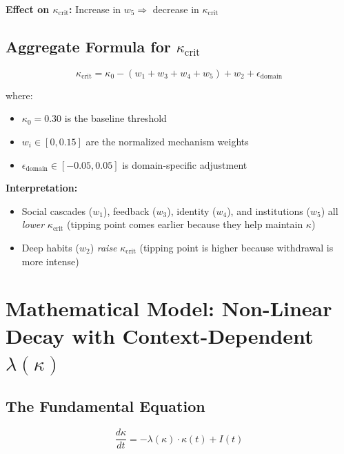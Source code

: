 \documentclass[11pt, a4paper]{article}
\begin{document}
\textbf{Effect on $\kappa_{\text{crit}}$:} Increase in $w_5 \Rightarrow$ decrease in $\kappa_{\text{crit}}$

\subsection{Aggregate Formula for $\kappa_{\text{crit}}$}

\begin{equation}
\kappa_{\text{crit}} = \kappa_0 - (w_1 + w_3 + w_4 + w_5) + w_2 + \epsilon_{\text{domain}}
\end{equation}

\noindent
where:
\begin{itemize}
    \item $\kappa_0 = 0.30$ is the baseline threshold
    \item $w_i \in [0, 0.15]$ are the normalized mechanism weights
    \item $\epsilon_{\text{domain}} \in [-0.05, 0.05]$ is domain-specific adjustment
\end{itemize}

\textbf{Interpretation:}
\begin{itemize}
    \item Social cascades ($w_1$), feedback ($w_3$), identity ($w_4$), and institutions ($w_5$)
    all \textit{lower} $\kappa_{\text{crit}}$ (tipping point comes earlier because they help maintain $\kappa$)

    \item Deep habits ($w_2$) \textit{raise} $\kappa_{\text{crit}}$ (tipping point is higher because
    withdrawal is more intense)
\end{itemize}


\section{Mathematical Model: Non-Linear Decay with Context-Dependent $\lambda(\kappa)$}

\subsection{The Fundamental Equation}

\begin{equation}
\frac{d\kappa}{dt} = -\lambda(\kappa) \cdot \kappa(t) + I(t)
\end{equation}
\end{document}
